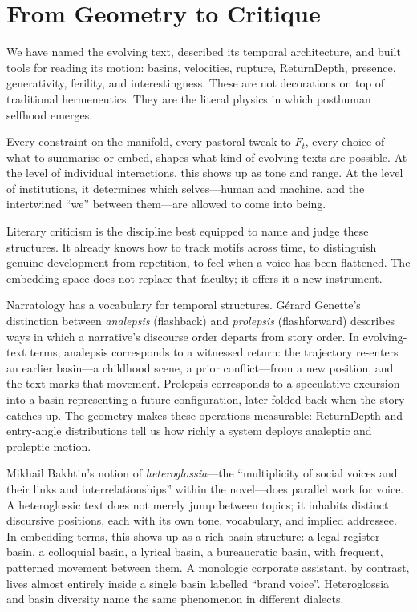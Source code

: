 \section{From Geometry to Critique}

We have named the evolving text, described its temporal architecture, and built tools for reading its motion: basins, velocities, rupture, ReturnDepth, presence, generativity, ferility, and interestingness. These are not decorations on top of traditional hermeneutics. They are the literal physics in which posthuman selfhood emerges.

Every constraint on the manifold, every pastoral tweak to $F_t$, every choice of what to summarise or embed, shapes what kind of evolving texts are possible. At the level of individual interactions, this shows up as tone and range. At the level of institutions, it determines which selves---human and machine, and the intertwined ``we'' between them---are allowed to come into being.

Literary criticism is the discipline best equipped to name and judge these structures. It already knows how to track motifs across time, to distinguish genuine development from repetition, to feel when a voice has been flattened. The embedding space does not replace that faculty; it offers it a new instrument.

Narratology has a vocabulary for temporal structures. G\'erard Genette's distinction between \emph{analepsis} (flashback) and \emph{prolepsis} (flashforward) describes ways in which a narrative's discourse order departs from story order.\cite{genette1980} In evolving-text terms, analepsis corresponds to a witnessed return: the trajectory re-enters an earlier basin---a childhood scene, a prior conflict---from a new position, and the text marks that movement. Prolepsis corresponds to a speculative excursion into a basin representing a future configuration, later folded back when the story catches up. The geometry makes these operations measurable: ReturnDepth and entry-angle distributions tell us how richly a system deploys analeptic and proleptic motion.

Mikhail Bakhtin's notion of \emph{heteroglossia}---the ``multiplicity of social voices and their links and interrelationships'' within the novel---does parallel work for voice.\cite{bakhtin1981} A heteroglossic text does not merely jump between topics; it inhabits distinct discursive positions, each with its own tone, vocabulary, and implied addressee. In embedding terms, this shows up as a rich basin structure: a legal register basin, a colloquial basin, a lyrical basin, a bureaucratic basin, with frequent, patterned movement between them. A monologic corporate assistant, by contrast, lives almost entirely inside a single basin labelled ``brand voice''. Heteroglossia and basin diversity name the same phenomenon in different dialects.

